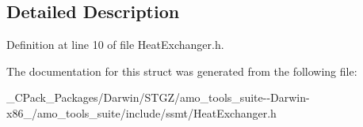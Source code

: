 \subsection{Detailed Description}


Definition at line 10 of file Heat\+Exchanger.\+h.



The documentation for this struct was generated from the following file\+:\begin{DoxyCompactItemize}
\item 
\+\_\+\+C\+Pack\+\_\+\+Packages/\+Darwin/\+S\+T\+G\+Z/amo\+\_\+tools\+\_\+suite-\/-\/\+Darwin-\/x86\+\_/amo\+\_\+tools\+\_\+suite/include/ssmt/Heat\+Exchanger.\+h\end{DoxyCompactItemize}
